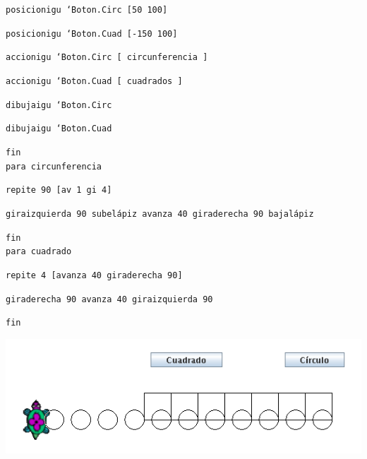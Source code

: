 \texttt{posicionigu \char`\"{}Boton.Circ   [50 100]}

\texttt{posicionigu \char`\"{}Boton.Cuad [-150 100]}

\texttt{accionigu \char`\"{}Boton.Circ [ circunferencia ]}

\texttt{accionigu \char`\"{}Boton.Cuad [ cuadrados ]}

\texttt{dibujaigu \char`\"{}Boton.Circ}

\texttt{dibujaigu \char`\"{}Boton.Cuad}

\noindent \texttt{fin} \\

\noindent \texttt{para circunferencia}

\texttt{repite 90 [av 1 gi 4]}

\texttt{giraizquierda 90 subel\'apiz avanza 40 giraderecha 90 bajal\'apiz}

\noindent \texttt{fin} \\

\noindent \texttt{para cuadrado}

\texttt{repite 4 [avanza 40 giraderecha 90]}

\texttt{giraderecha 90 avanza 40 giraizquierda 90}

\noindent \texttt{fin}
\begin{center}
   \includegraphics[scale=0.8]{Imagenes/10_Usuario/EjemplosIGU_03.png}
\end{center}